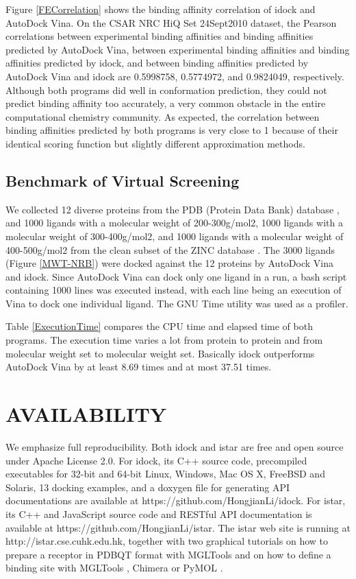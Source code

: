 \documentclass[12pt]{article}
\begin{document}
Figure \ref{FECorrelation} shows the binding affinity correlation of idock and AutoDock Vina. On the CSAR NRC HiQ Set 24Sept2010 dataset, the Pearson correlations between experimental binding affinities and binding affinities predicted by AutoDock Vina, between experimental binding affinities and binding affinities predicted by idock, and between binding affinities predicted by AutoDock Vina and idock are 0.5998758, 0.5774972, and 0.9824049, respectively. Although both programs did well in conformation prediction, they could not predict binding affinity too accurately, a very common obstacle in the entire computational chemistry community. As expected, the correlation between binding affinities predicted by both programs is very close to 1 because of their identical scoring function but slightly different approximation methods.

\subsection*{\sffamily \large Benchmark of Virtual Screening}

We collected 12 diverse proteins from the PDB (Protein Data Bank) database \cite{540,537}, and 1000 ligands with a molecular weight of 200-300g/mol2, 1000 ligands with a molecular weight of 300-400g/mol2, and 1000 ligands with a molecular weight of 400-500g/mol2 from the clean subset of the ZINC database \cite{532,1178}. The 3000 ligands (Figure \ref{MWT-NRB}) were docked against the 12 proteins by AutoDock Vina and idock. Since AutoDock Vina can dock only one ligand in a run, a bash script containing 1000 lines was executed instead, with each line being an execution of Vina to dock one individual ligand. The GNU Time utility was used as a profiler.

Table \ref{ExecutionTime} compares the CPU time and elapsed time of both programs. The execution time varies a lot from protein to protein and from molecular weight set to molecular weight set. Basically idock outperforms AutoDock Vina by at least 8.69 times and at most 37.51 times.

\section*{\sffamily \Large AVAILABILITY}

We emphasize full reproducibility. Both idock and istar are free and open source under Apache License 2.0. For idock, its C++ source code, precompiled executables for 32-bit and 64-bit Linux, Windows, Mac OS X, FreeBSD and Solaris, 13 docking examples, and a doxygen file for generating API documentations are available at https://github.com/HongjianLi/idock. For istar, its C++ and JavaScript source code and RESTful API documentation is available at https://github.com/HongjianLi/istar. The istar web site is running at http://istar.cse.cuhk.edu.hk, together with two graphical tutorials on how to prepare a receptor in PDBQT format with MGLTools \citep{596} and on how to define a binding site with MGLTools \citep{596}, Chimera \citep{1219} or PyMOL \citep{1221}.
\end{document}
